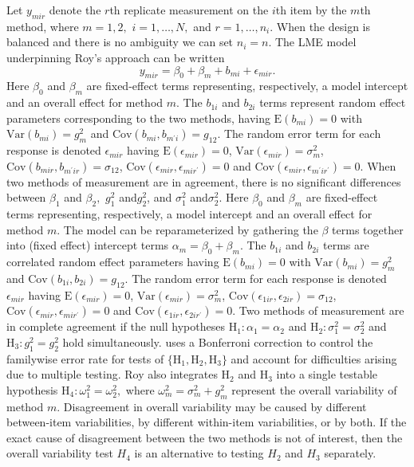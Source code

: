 \documentclass[12pt, a4paper]{report}
\theoremstyle{plain}
\theoremstyle{definition}
\theoremstyle{remark}
\begin{document}
Let $y_{mir} $ denote the $r$th replicate measurement on the $i$th item by the $m$th method, where $m=1,2,$ $i=1,\ldots,N,$ and $r = 1,\ldots,n_i.$ When the design is balanced and there is no ambiguity we can set $n_i=n.$ The LME model underpinning Roy's approach can be written
\begin{equation}\label{Roy-model}
y_{mir} = \beta_{0} + \beta_{m} + b_{mi} + \epsilon_{mir}.
\end{equation}
Here $\beta_0$ and $\beta_m$ are fixed-effect terms representing, respectively, a model intercept and an overall effect for method $m.$ The $b_{1i}$ and $b_{2i}$ terms represent random effect parameters corresponding to the two methods, having $\mathrm{E}(b_{mi})=0$ with $\mathrm{Var}(b_{mi})=g^2_m$ and $\mathrm{Cov}(b_{mi}, b_{m^\prime i})=g_{12}.$ The random error term for each response is denoted $\epsilon_{mir}$ having $\mathrm{E}(\epsilon_{mir})=0$, $\mathrm{Var}(\epsilon_{mir})=\sigma^2_m$, $\mathrm{Cov}(b_{mir}, b_{m^\prime ir})=\sigma_{12}$, $\mathrm{Cov}(\epsilon_{mir}, \epsilon_{mir^\prime})= 0$ and $\mathrm{Cov}(\epsilon_{mir}, \epsilon_{m^\prime ir^\prime})= 0.$
When two methods of measurement are in agreement, there is no significant differences between $\beta_1$ and $\beta_2,$ $g^2_1 $ and$ g^2_2$, and $\sigma^2_1 $ and$ \sigma^2_2$.
\bigskip
Here $\beta_0$ and $\beta_m$ are fixed-effect terms representing, respectively, a model intercept and an overall effect for method $m.$ The model can be reparameterized by gathering the $\beta$ terms together into (fixed effect) intercept terms $\alpha_m=\beta_0+\beta_m.$ The $b_{1i}$ and $b_{2i}$ terms are correlated random effect parameters having $\mathrm{E}(b_{mi})=0$ with $\mathrm{Var}(b_{mi})=g^2_m$ and $\mathrm{Cov}(b_{1i}, b_{2 i})=g_{12}.$ The random error term for each response is denoted $\epsilon_{mir}$ having $\mathrm{E}(\epsilon_{mir})=0$, $\mathrm{Var}(\epsilon_{mir})=\sigma^2_m$, $\mathrm{Cov}(\epsilon_{1ir}, \epsilon_{2 ir})=\sigma_{12}$, $\mathrm{Cov}(\epsilon_{mir}, \epsilon_{mir^\prime})= 0$ and $\mathrm{Cov}(\epsilon_{1ir}, \epsilon_{2 ir^\prime})= 0.$ Two methods of measurement are in complete agreement if the null hypotheses $\mathrm{H}_1\colon \alpha_1 = \alpha_2$ and $\mathrm{H}_2\colon \sigma^2_1 = \sigma^2_2 $ and $\mathrm{H}_3\colon g^2_1= g^2_2$ hold simultaneously. \citet{roy} uses a Bonferroni correction to control the familywise error rate for tests of $\{\mathrm{H}_1, \mathrm{H}_2, \mathrm{H}_3\}$ and account for difficulties arising due to multiple testing. Roy also integrates $\mathrm{H}_2$ and $\mathrm{H}_3$ into a single testable hypothesis $\mathrm{H}_4\colon \omega^2_1=\omega^2_2,$ where $\omega^2_m = \sigma^2_m + g^2_m$ represent the overall variability of method $m.$  Disagreement in overall variability may be caused by different between-item variabilities, by different within-item variabilities, or by both.  If the exact cause of disagreement between the two methods is not of interest, then the overall variability test $H_4$ is an alternative to testing $H_2$ and $H_3$ separately.
\newpage
\end{document}
